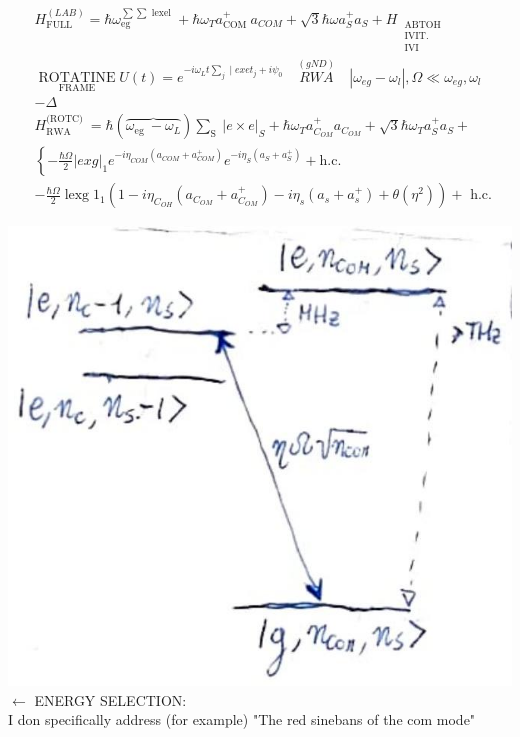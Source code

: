 \documentclass[10pt]{article}
\begin{document}
$$
\begin{aligned}
& H_{\text {FULL }}^{(L A B)}=\hbar \omega_{\text {eg }}^{\sum \sum \text { lexel }}+\hbar \omega_{T} a_{\text {COM }}^{+} a_{C O M}+\sqrt{3} \hbar \omega a_{S}^{+} a_{S}+H_{\substack{\text { ABTOH } \\
\text { IVIT. } \\
\text { IVI }}} \\
& \underset{\text { FRAME }}{\operatorname{ROTATINE}} U(t)=e^{-i \omega_{L} t \sum_{j} \mid e x e t_{j}+i \psi_{0}} \quad \stackrel{(g N D)}{R W A} \quad\left|\omega_{e g}-\omega_{l}\right|, \Omega \ll \omega_{e g}, \omega_{l} \\
& -\Delta \\
& H_{\text {RWA }}^{\text {(ROTC) }}=\hbar(\overbrace{\omega_{\text {eg }}-\omega_{L}}) \sum_{\text {S }}|e \times e|_{S}+\hbar \omega_{T} a_{C_{O M}}^{+} a_{C_{O M}}+\sqrt{3} \hbar \omega_{T} a_{S}^{+} a_{S}+ \\
& \left\{-\frac{\hbar \Omega}{2}|e x g|_{1} e^{-i \eta_{C O M}\left(a_{C O M}+a_{C O M}^{+}\right)} e^{-i \eta_{S}\left(a_{S}+a_{S}^{+}\right)}+\right.\text {h.c. } \\
& -\frac{\hbar \Omega}{2} \operatorname{lexg} 1_{1}\left(1-i \eta_{C_{O H}}\left(a_{C_{O M}}+a_{C_{O M}}^{+}\right)-i \eta_{s}\left(a_{s}+a_{s}^{+}\right)+\theta\left(\eta^{2}\right)\right)+\text { h.c. }
\end{aligned}
$$

\includegraphics[max width=\textwidth, center]{2025_10_16_f28de32ab20bd0ac9bbfg-4}\\
$\leftarrow$ ENERGY SELECTION:\\
I don specifically address (for example) "The red sinebans of the com mode"
\end{document}
